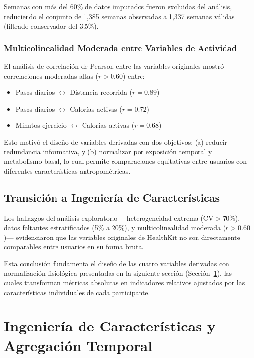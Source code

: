 Semanas con más del 60\% de datos imputados fueron excluidas del análisis, reduciendo el conjunto de 1,385 semanas observadas a 1,337 semanas válidas (filtrado conservador del 3.5\%).

\subsubsection{Multicolinealidad Moderada entre Variables de Actividad}

El análisis de correlación de Pearson entre las variables originales mostró correlaciones moderadas-altas ($r>0.60$) entre:
\begin{itemize}
    \item Pasos diarios $\leftrightarrow$ Distancia recorrida ($r=0.89$)
    \item Pasos diarios $\leftrightarrow$ Calorías activas ($r=0.72$)
    \item Minutos ejercicio $\leftrightarrow$ Calorías activas ($r=0.68$)
\end{itemize}

Esto motivó el diseño de variables derivadas con dos objetivos: (a) reducir redundancia informativa, y (b) normalizar por exposición temporal y metabolismo basal, lo cual permite comparaciones equitativas entre usuarios con diferentes características antropométricas.

\subsection{Transición a Ingeniería de Características}
\label{subsec:transicion_feature_engineering}

Los hallazgos del análisis exploratorio —heterogeneidad extrema (CV$>$70\%), datos faltantes estratificados (5\% a 20\%), y multicolinealidad moderada ($r>0.60$)— evidenciaron que las variables originales de HealthKit no son directamente comparables entre usuarios en su forma bruta.

Esta conclusión fundamenta el diseño de las cuatro variables derivadas con normalización fisiológica presentadas en la siguiente sección (Sección~\ref{sec:feature_engineering}), las cuales transforman métricas absolutas en indicadores relativos ajustados por las características individuales de cada participante.

\section{Ingeniería de Características y Agregación Temporal}
\label{sec:feature_engineering}

